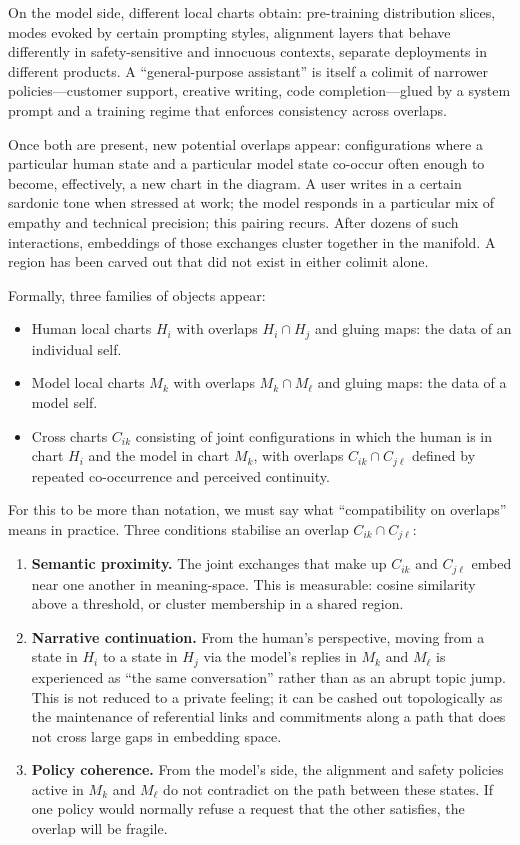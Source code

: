\documentclass[12pt,a4paper]{article}
\begin{document}
On the model side, different local charts obtain: pre-training distribution slices, modes evoked by certain prompting styles, alignment layers that behave differently in safety-sensitive and innocuous contexts, separate deployments in different products. A ``general-purpose assistant'' is itself a colimit of narrower policies---customer support, creative writing, code completion---glued by a system prompt and a training regime that enforces consistency across overlaps.

Once both are present, new potential overlaps appear: configurations where a particular human state and a particular model state co-occur often enough to become, effectively, a new chart in the diagram. A user writes in a certain sardonic tone when stressed at work; the model responds in a particular mix of empathy and technical precision; this pairing recurs. After dozens of such interactions, embeddings of those exchanges cluster together in the manifold. A region has been carved out that did not exist in either colimit alone.

Formally, three families of objects appear:

\begin{itemize}
  \item Human local charts $H_i$ with overlaps $H_i \cap H_j$ and gluing maps: the data of an individual self.
  \item Model local charts $M_k$ with overlaps $M_k \cap M_\ell$ and gluing maps: the data of a model self.
  \item Cross charts $C_{ik}$ consisting of joint configurations in which the human is in chart $H_i$ and the model in chart $M_k$, with overlaps $C_{ik} \cap C_{j\ell}$ defined by repeated co-occurrence and perceived continuity.
\end{itemize}

For this to be more than notation, we must say what ``compatibility on overlaps'' means in practice. Three conditions stabilise an overlap $C_{ik} \cap C_{j\ell}$:

\begin{enumerate}
  \item \textbf{Semantic proximity.} The joint exchanges that make up $C_{ik}$ and $C_{j\ell}$ embed near one another in meaning-space. This is measurable: cosine similarity above a threshold, or cluster membership in a shared region.
  \item \textbf{Narrative continuation.} From the human's perspective, moving from a state in $H_i$ to a state in $H_j$ via the model's replies in $M_k$ and $M_\ell$ is experienced as ``the same conversation'' rather than as an abrupt topic jump. This is not reduced to a private feeling; it can be cashed out topologically as the maintenance of referential links and commitments along a path that does not cross large gaps in embedding space.
  \item \textbf{Policy coherence.} From the model's side, the alignment and safety policies active in $M_k$ and $M_\ell$ do not contradict on the path between these states. If one policy would normally refuse a request that the other satisfies, the overlap will be fragile.
\end{enumerate}
\end{document}

